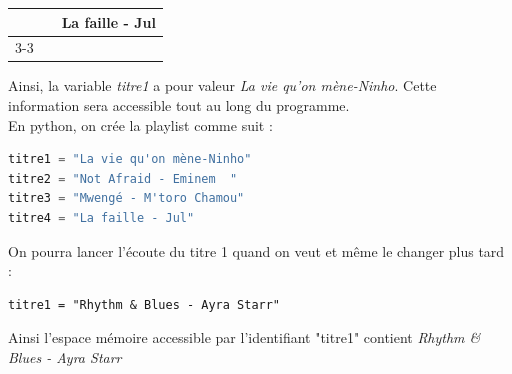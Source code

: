\begin{Comprendre}
\begin{minipage}{0.49\textwidth}
\begin{tabular}{c c |c|}
           & & La faille - Jul\\
           \cline{3-3}
    \end{tabular} 
\end{minipage}
Ainsi, la variable \textit{titre1} a pour valeur \textit{La vie qu'on mène-Ninho}. Cette information sera accessible tout au long du programme.\\
En python, on crée la playlist comme suit :
\begin{lstlisting}[style=pythonstyle, language=Python]
titre1 = "La vie qu'on mène-Ninho"  
titre2 = "Not Afraid - Eminem  "
titre3 = "Mwengé - M'toro Chamou"  
titre4 = "La faille - Jul"  
\end{lstlisting}
On pourra lancer l'écoute du titre 1 quand on veut et même le changer plus tard :
\begin{lstlisting}
titre1 = "Rhythm & Blues - Ayra Starr"
\end{lstlisting}
Ainsi l'espace mémoire accessible par l'identifiant "titre1" contient \textit{Rhythm \& Blues - Ayra Starr}
\end{Comprendre}
\vspace{-1.4cm}
